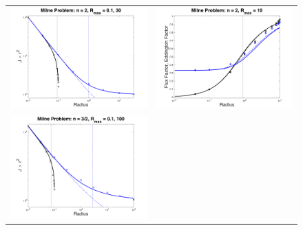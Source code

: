 \documentclass[11pt,letterpaper,twoside,english,final]{article}
\begin{document}
\begin{figure}[h]
  \centering
  \begin{tabular}{cc}
    \includegraphics[scale=0.4]{./Figures/MilneProblem1D_n20.png} &
    \includegraphics[scale=0.4]{./Figures/MilneProblem1D_n20_EddingtonFactors.png} \\
    \includegraphics[scale=0.4]{./Figures/MilneProblem1D_n15.png} &

\end{tabular}
\end{figure}
\end{document}
